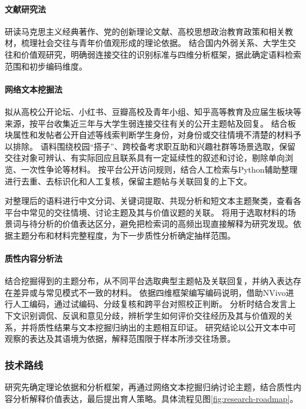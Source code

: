 \paragraph{文献研究法}
研读马克思主义经典著作、党的创新理论文献、高校思想政治教育政策和相关教材，梳理社会交往与青年价值观形成的理论依据。
结合国内外弱关系、大学生交往和价值观研究，明确弱连接交往的识别标准与四维分析框架，据此确定语料检索范围和初步编码维度。

\paragraph{网络文本挖掘法}
拟从高校公开论坛、小红书、豆瓣高校及青年小组、知乎高等教育及应届生板块等来源，按平台收集近三年与大学生弱连接交往有关的公开主题帖及回复。
结合板块属性和发帖者公开自述等线索判断学生身份，对身份或交往情境不清楚的材料予以排除。
语料围绕校园“搭子”、跨校备考求职互助和兴趣社群等场景选取，保留交往对象可辨认、有实际回应且联系具有一定延续性的叙述和讨论，剔除单向浏览、一次性争论等材料。
按平台公开访问规则，结合人工检索与Python辅助整理进行去重、去标识化和人工复核，保留主题帖与关联回复的上下文。

对整理后的语料进行中文分词、关键词提取、共现分析和短文本主题聚类，查看各平台中常见的交往情境、讨论主题及其与价值议题的关联。
将用于选取材料的场景词与待分析的价值表达区分，避免把检索词的高频出现直接解释为研究发现。依据主题分布和材料完整程度，为下一步质性分析确定抽样范围。

\paragraph{质性内容分析法}
结合挖掘得到的主题分布，从不同平台选取典型主题帖及关联回复，并纳入表达存在差异或与常见模式不一致的材料。
依据四维框架编写编码说明，借助NVivo进行人工编码，通过试编码、分歧复核和跨平台对照校正判断。
分析时结合发言上下文识别调侃、反讽和意见分歧，辨析学生如何评价交往经历及其与价值观的关系，并将质性结果与文本挖掘归纳出的主题相互印证。
研究结论以公开文本中可观察的表达及其语境为依据，解释范围限于样本所涉交往场景。

\subsubsection{技术路线}

研究先确定理论依据和分析框架，再通过网络文本挖掘归纳讨论主题，结合质性内容分析解释价值表达，最后提出育人策略。具体流程见图\ref{fig:research-roadmap}。

